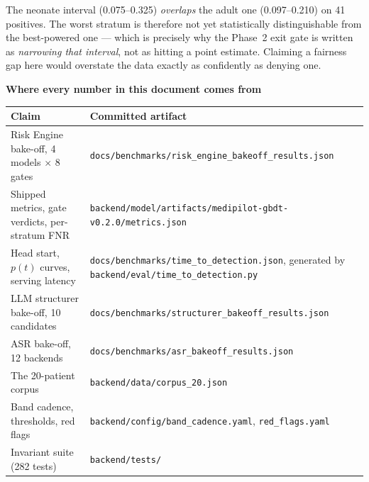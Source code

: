 \documentclass[10pt,a4paper,twocolumn]{article}
\newcommand{\pth}[1]{\textcolor{SecPurple}{\texttt{#1}}}
\begin{document}
\vspace{4pt}
The neonate interval (0.075--0.325) \emph{overlaps} the adult one (0.097--0.210) on 41 positives.
The worst stratum is therefore not yet statistically distinguishable from the best-powered one ---
which is precisely why the Phase~2 exit gate is written as \emph{narrowing that interval}, not as
hitting a point estimate. Claiming a fairness gap here would overstate the data exactly as
confidently as denying one.

\vspace{5pt}
{\sffamily\bfseries\footnotesize\color{SecPurple}Where every number in this document comes
from}\par\vspace{2pt}

{\scriptsize\sffamily\setlength{\tabcolsep}{3.5pt}
\begin{tabular}{@{}p{2.7cm}p{5.0cm}@{}}
\toprule
\rowcolor{AccPurple!10}
\textbf{Claim} & \textbf{Committed artifact}\\
\midrule
Risk Engine bake-off, 4 models $\times$ 8 gates & \pth{docs/benchmarks/}\newline\pth{risk\_engine\_bakeoff\_results.json}\\
\addlinespace[2pt]
Shipped metrics, gate verdicts, per-stratum FNR & \pth{backend/model/artifacts/}\newline\pth{medipilot-gbdt-v0.2.0/metrics.json}\\
\addlinespace[2pt]
Head start, $p(t)$ curves, serving latency & \pth{docs/benchmarks/}\newline\pth{time\_to\_detection.json}, generated by \pth{backend/eval/time\_to\_detection.py}\\
\addlinespace[2pt]
LLM structurer bake-off, 10 candidates & \pth{docs/benchmarks/}\newline\pth{structurer\_bakeoff\_results.json}\\
\addlinespace[2pt]
ASR bake-off, 12 backends & \pth{docs/benchmarks/}\newline\pth{asr\_bakeoff\_results.json}\\
\addlinespace[2pt]
The 20-patient corpus & \pth{backend/data/corpus\_20.json}\\
\addlinespace[2pt]
Band cadence, thresholds, red flags & \pth{backend/config/}\newline\pth{band\_cadence.yaml}, \pth{red\_flags.yaml}\\
\addlinespace[2pt]
Invariant suite (282 tests) & \pth{backend/tests/}\\
\bottomrule
\end{tabular}\par}
\end{document}

